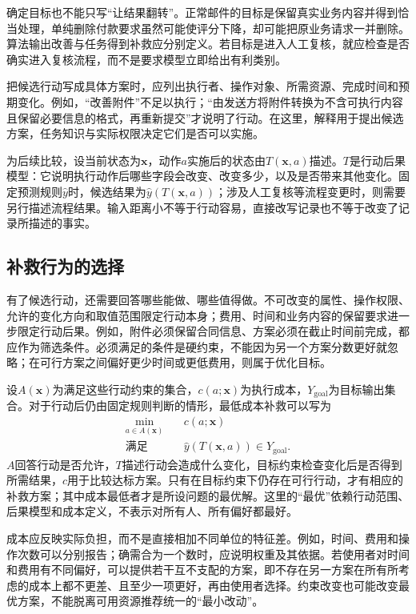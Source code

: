 确定目标也不能只写“让结果翻转”。正常邮件的目标是保留真实业务内容并得到恰当处理，单纯删除付款要求虽然可能使评分下降，却可能把原业务请求一并删除。算法输出改善与任务得到补救应分别定义。若目标是进入人工复核，就应检查是否确实进入复核流程，而不是要求模型立即给出有利类别。

把候选行动写成具体方案时，应列出执行者、操作对象、所需资源、完成时间和预期变化。例如，“改善附件”不足以执行；“由发送方将附件转换为不含可执行内容且保留必要信息的格式，再重新提交”才说明了行动。在这里，解释用于提出候选方案，任务知识与实际权限决定它们是否可以实施。

为后续比较，设当前状态为$\bm{x}$，动作$a$实施后的状态由$T(\bm{x},a)$描述。$T$是行动后果模型：它说明执行动作后哪些字段会改变、改变多少，以及是否带来其他变化。固定预测规则$\hat y$时，候选结果为$\hat y(T(\bm{x},a))$；涉及人工复核等流程变更时，则需要另行描述流程结果。输入距离小不等于行动容易，直接改写记录也不等于改变了记录所描述的事实。

\subsection{补救行为的选择}
\label{sec:interpretability-recourse-action}

有了候选行动，还需要回答哪些能做、哪些值得做。不可改变的属性、操作权限、允许的变化方向和取值范围限定行动本身；费用、时间和业务内容的保留要求进一步限定行动后果。例如，附件必须保留合同信息、方案必须在截止时间前完成，都应作为筛选条件。必须满足的条件是硬约束，不能因为另一个方案分数更好就忽略；在可行方案之间偏好更少时间或更低费用，则属于优化目标。

设$A(\bm{x})$为满足这些行动约束的集合，$c(a;\bm{x})$为执行成本，$Y_{\mathrm{goal}}$为目标输出集合。对于行动后仍由固定规则判断的情形，最低成本补救可以写为
\begin{equation}
 \begin{aligned}
 \min_{a\in A(\bm{x})}\quad &c(a;\bm{x})\\
 \text{满足}\quad &\hat y(T(\bm{x},a))\in Y_{\mathrm{goal}}.
 \end{aligned}
 \label{eq:interpretability-recourse}
\end{equation}
$A$回答行动是否允许，$T$描述行动会造成什么变化，目标约束检查变化后是否得到所需结果，$c$用于比较达标方案。只有在目标约束下仍存在可行行动，才有相应的补救方案；其中成本最低者才是所设问题的最优解。这里的“最优”依赖行动范围、后果模型和成本定义，不表示对所有人、所有偏好都最好。

成本应反映实际负担，而不是直接相加不同单位的特征差。例如，时间、费用和操作次数可以分别报告；确需合为一个数时，应说明权重及其依据。若使用者对时间和费用有不同偏好，可以提供若干互不支配的方案，即不存在另一方案在所有所考虑的成本上都不更差、且至少一项更好，再由使用者选择。约束改变也可能改变最优方案，不能脱离可用资源推荐统一的“最小改动”。

